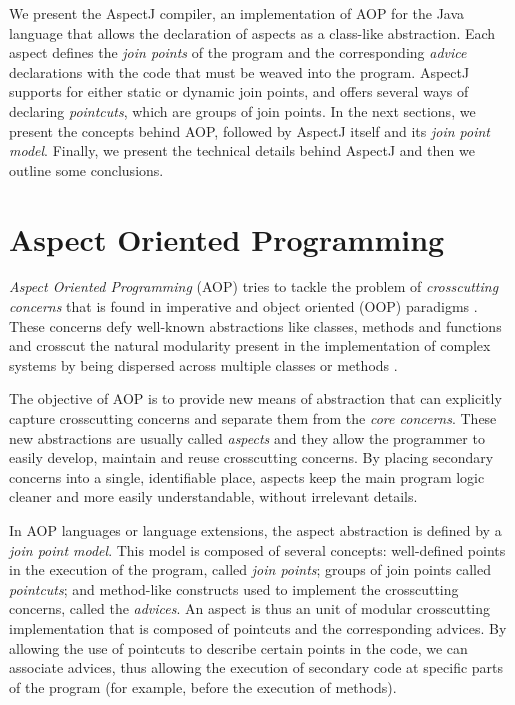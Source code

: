 \documentclass{template}
\begin{document}
We present the AspectJ compiler, an implementation of AOP for the Java language that allows the declaration
of aspects as a class-like abstraction. Each aspect defines the \emph{join points} of the program and the corresponding
\emph{advice} declarations with the code that must be weaved into the program. AspectJ supports for either static or dynamic join points,
and offers several ways of declaring \emph{pointcuts}, which are groups of join points.
In the next sections, we present the concepts behind AOP, followed by
AspectJ itself and its \emph{join point model}. Finally, we present the technical details
behind AspectJ and then we outline some conclusions.

\section{Aspect Oriented Programming}

\emph{Aspect Oriented Programming} (AOP) tries to tackle the problem of \emph{crosscutting concerns}
that is found in imperative and object oriented (OOP) paradigms \cite{Kiczales97aspect-orientedprogramming}.
These concerns defy well-known abstractions like classes, methods and functions and crosscut the
natural modularity present in the implementation of complex systems by being dispersed
across multiple classes or methods \cite{Kiczales01anoverview}.

The objective of AOP is to provide new means of abstraction that can explicitly capture crosscutting concerns
and separate them from the \emph{core concerns}. These new abstractions are usually called \emph{aspects}
and they allow the programmer to easily develop, maintain and reuse crosscutting concerns. By placing
secondary concerns into a single, identifiable place, aspects keep the main program logic cleaner and more easily
understandable, without irrelevant details.

In AOP languages or language extensions, the aspect abstraction is defined by a \emph{join point model}.
This model is composed of several concepts: well-defined points in the execution of the program,
called \emph{join points}; groups of join points called \emph{pointcuts}; and method-like constructs used to
implement the crosscutting concerns, called the \emph{advices}. An aspect is thus an unit of modular
crosscutting implementation that is composed of pointcuts and the corresponding advices. By allowing the
use of pointcuts to describe certain points in the code, we can associate advices, thus allowing the execution
of secondary code at specific parts of the program (for example, before the execution of methods).
\end{document}

